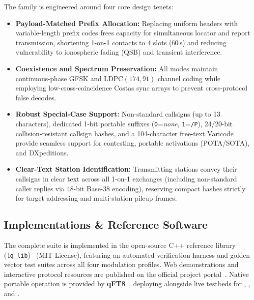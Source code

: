 The \LQ{} family is engineered around four core design tenets:
\begin{itemize}[leftmargin=1.5em, itemsep=1.5pt plus 1.0pt minus 0.5pt, topsep=2.0pt plus 1.0pt minus 0.5pt]
  \item \textbf{Payload-Matched Prefix Allocation:} Replacing uniform headers with variable-length prefix codes frees capacity for simultaneous locator and report transmission, shortening 1-on-1 contacts to 4 slots (60\,s) and reducing vulnerability to ionospheric fading (QSB) and transient interference.
  \item \textbf{Coexistence and Spectrum Preservation:} All modes maintain continuous-phase GFSK and LDPC$(174,91)$ channel coding while employing low-cross-coincidence Costas sync arrays to prevent cross-protocol false decodes.
  \item \textbf{Robust Special-Case Support:} Non-standard callsigns (up to 13 characters), dedicated 1-bit portable suffixes (\texttt{0}=\emph{none}, \texttt{1}=\texttt{/P}), 24/20-bit collision-resistant callsign hashes, and a 104-character free-text Varicode provide seamless support for contesting, portable activations (POTA/SOTA), and DXpeditions.
  \item \textbf{Clear-Text Station Identification:} Transmitting stations convey their callsigns in clear text across all 1-on-1 exchanges (including non-standard caller replies via 48-bit Base-38 encoding), reserving compact hashes strictly for target addressing and multi-station pileup frames.
\end{itemize}

\subsection{Implementations \& Reference Software}
\label{sec:implementations}

The complete suite is implemented in the open-source C++ reference library (\texttt{lq\_lib})~\cite{lqlib} (MIT License), featuring an automated verification harness and golden vector test suites across all four modulation profiles. Web demonstrations and interactive protocol resources are published on the official project portal~\cite{lqportal}. Native portable operation is provided by \textbf{qFT8}~\cite{qft8}, deploying  alongside live testbeds for , , and .

\pagebreak


